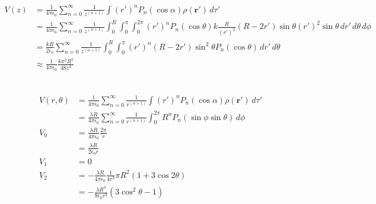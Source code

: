\documentclass{article}
\renewcommand{\vec}[1]{\boldsymbol{\mathbf{#1}}}
\newcommand{\ke}{\frac{1}{4 \pi \epsilon_0}}
\begin{document}
\begin{align*}
  V(z) & = \ke \sum_{n = 0}^\infty \frac{1}{z^{(n + 1)}} \int (r')^n P_n(\cos \alpha) \rho(\vec{r}') \,d \tau'                                                                                              \\
       & = \ke \sum_{n = 0}^\infty \frac{1}{z^{(n + 1)}} \int_0^R \int_0^\pi \int_0^{2 \pi} (r')^n P_n(\cos \theta) k \frac{R}{(r')^2} (R - 2 r') \sin \theta (r')^2 \sin \theta \,d r' \,d \theta \,d \phi \\
       & = \frac{k R}{2 \epsilon_0} \sum_{n = 0}^\infty \frac{1}{z^{(n + 1)}} \int_0^R \int_0^\pi (r')^n (R - 2 r') \sin^2 \theta P_n(\cos \theta) \,d r' \,d \theta                                        \\
       & \approx \ke \frac{k \pi^2 R^5}{48 z^3}                                                                                                                                                             \\
\end{align*}

\subsection{}

\begin{align*}
  V(r, \theta) & = \ke \sum_{n = 0}^\infty \frac{1}{r^{(n + 1)}} \int (r')^n P_n(\cos \alpha) \rho (\vec{r}') \,d \tau'                                \\
               & = \frac{\lambda R}{4 \pi \epsilon_0} \sum_{n = 0}^\infty \frac{1}{r^{(n + 1)}} \int_0^{2 \pi} R^n P_n(\sin \phi \sin \theta) \,d \phi \\
  V_0          & = \frac{\lambda R}{4 \pi \epsilon_0} \frac{2 \pi}{r}                                                                                  \\
               & = \frac{\lambda R}{2 \epsilon_0 r}                                                                                                    \\
  V_1          & = 0                                                                                                                                   \\
  V_2          & = -\frac{\lambda R}{4 \pi \epsilon_0} \frac{1}{4 r^3} \pi R^2 (1 + 3 \cos 2 \theta)                                                   \\
               & = -\frac{\lambda R^3}{8 \epsilon_0 r^3} (3 \cos^2 \theta - 1)
\end{align*}
\end{document}
